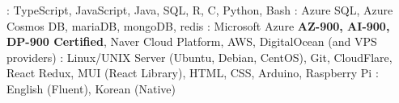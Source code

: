 

\begin{cvparagraph}
  \raggedright
  : TypeScript, JavaScript, Java, SQL, R, C, Python, Bash
  \linebreak
  : Azure SQL, Azure Cosmos DB, mariaDB, mongoDB, redis
  \linebreak
  : Microsoft Azure \textbf{AZ-900, AI-900, DP-900 Certified}, Naver Cloud Platform, AWS, DigitalOcean (and VPS providers)
  \linebreak
  : Linux/UNIX Server (Ubuntu, Debian, CentOS), Git, CloudFlare, React Redux, MUI (React Library), HTML, CSS, Arduino, Raspberry Pi
  \linebreak
  : English (Fluent), Korean (Native)
\end{cvparagraph}